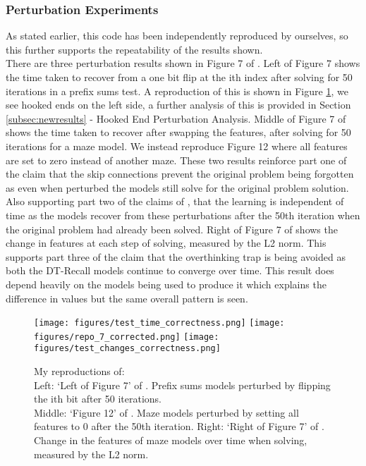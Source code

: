 \subsubsection{Perturbation Experiments}
As stated earlier, this code has been independently reproduced by ourselves, so this further supports the repeatability of the results shown.\\
There are three perturbation results shown in Figure 7 of \cite{bansal2022endtoend}. Left of Figure 7 shows the time taken to recover from a one bit flip at the ith index after solving for 50 iterations in a prefix sums test. A reproduction of this is shown in Figure \ref{figs:peturb}, we see hooked ends on the left side, a further analysis of this is provided in Section \ref{subsec:newresults} - Hooked End Perturbation Analysis.
Middle of Figure 7 of \cite{bansal2022endtoend} shows the time taken to recover after swapping the features, after solving for 50 iterations for a maze model. We instead reproduce Figure 12 where all features are set to zero instead of another maze.
These two results reinforce part one of the claim that the skip connections prevent the original problem being forgotten as even when perturbed the models still solve for the original problem solution.
Also supporting part two of the claims of \cite{bansal2022endtoend}, that the learning is independent of time as the models recover from these perturbations after the 50th iteration when the original problem had already been solved.
Right of Figure 7 of \cite{bansal2022endtoend} shows the change in features at each step of solving, measured by the L2 norm. This supports part three of the claim that the overthinking trap is being avoided as both the DT-Recall models continue to converge over time. This result does depend heavily on the models being used to produce it which explains the difference in values but the same overall pattern is seen.
\begin{figure}[h]
    \texttt{[image: figures/test\_time\_correctness.png]}\hfill
    \texttt{[image: figures/repo\_7\_corrected.png]}\hfill
    \texttt{[image: figures/test\_changes\_correctness.png]}
    \\[\smallskipamount]
    \caption{My reproductions of:\\
    Left: `Left of Figure 7' of \cite{bansal2022endtoend}. Prefix sums models perturbed by flipping the ith bit after 50 iterations.\\
    Middle: `Figure 12' of \cite{bansal2022endtoend}. Maze models perturbed by setting all features to 0 after the 50th iteration.
    Right: `Right of Figure 7' of \cite{bansal2022endtoend}. Change in the features of maze models over time when solving, measured by the L2 norm.}
    \label{figs:peturb}
\end{figure}


